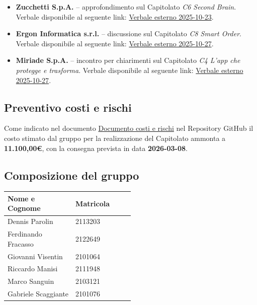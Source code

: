 \documentclass[a4paper,12pt]{article}
\begin{document}
\begin{itemize}
    \item \textbf{Zucchetti S.p.A.} – approfondimento sul Capitolato \emph{C6 Second Brain}.  
    Verbale disponibile al seguente link: \href{<LINK_VERBALE_ZUCCHETTI>}{Verbale esterno 2025-10-23}.
    \item \textbf{Ergon Informatica s.r.l.} – discussione sul Capitolato \emph{C8 Smart Order}.  
    Verbale disponibile al seguente link: \href{<LINK_VERBALE_ERGON>}{Verbale esterno 2025-10-27}.
    \item \textbf{Miriade S.p.A.} – incontro per chiarimenti sul Capitolato \emph{C4 L’app che protegge e trasforma}.  
    Verbale disponibile al seguente link: \href{<LINK_VERBALE_MIRIADE>}{Verbale esterno 2025-10-27}.
\end{itemize}

\subsection{Preventivo costi e rischi}
Come indicato nel documento \href{URL}{Documento costi e rischi} nel Repository GitHub il costo stimato dal gruppo per la realizzazione del Capitolato ammonta a \textbf{11.100,00€}, con la consegna prevista in data \textbf{2026-03-08}.

\subsection{Composizione del gruppo}

\begin{center}
\small
\renewcommand{\arraystretch}{1.2}
\begin{tabular}{|p{0.3\linewidth}|p{0.2\linewidth}|}
\hline
\rowcolor{gray!60}
\textbf{Nome e Cognome} & \textbf{Matricola} \\
\hline
Dennis Parolin & 2113203 \\
\hline
Ferdinando Fracasso & 2122649 \\
\hline
Giovanni Visentin & 2101064 \\
\hline
Riccardo Manisi & 2111948 \\
\hline
Marco Sanguin & 2103121 \\
\hline
Gabriele Scaggiante & 2101076 \\
\hline
\end{tabular}
\end{center}

\clearpage
\end{document}
